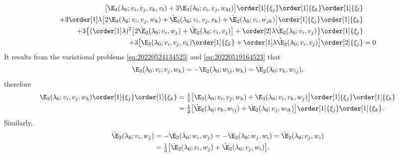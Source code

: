 \begin{equation*}
  \begin{aligned}[b]
    \bigl[\E_4(\lambda_0; v_i, v_j, v_k, v_l) + 3\E_3(\lambda_0; v_i, v_j, w_{kl})\bigr] \order[1]{\xi_j} \order[1]{\xi_k} \order[1]{\xi_l}&\\
    + 3\order[1]\lambda \bigl[2\E_3(\lambda_0; v_i, v_j, w_k) + \dot{\E}_3(\lambda_0; v_i, v_j, v_k) + \dot{\E}_2(\lambda_0; v_i, w_{jk}) \bigr] \order[1]{\xi_j} \order[1]{\xi_k}&\\
    + 3 \bigl\{ ( \order[1]\lambda )^2 \bigl[ 2 \dot{\E}_2(\lambda_0; v_i, w_j) + \ddot{\E}_2(\lambda_0; v_i, v_j) \bigr] + \order[2]\lambda \dot{\E}_2(\lambda_0; v_i, v_j) \bigr\}\order[1]{\xi_j}&\\
    + 3\bigl[\E_3(\lambda_0; v_i, v_j, v_k) \order[1]{\xi_k} + \order[1]\lambda \dot{\E}_2(\lambda_0; v_i, v_j)\bigr] \order[2]{\xi_j} &= 0
  \end{aligned}
\end{equation*}
It results from the variational problems \eqref{eq:20220524134525} and
\eqref{eq:20220519164523} that
\begin{equation*}
  \E_3(\lambda_0; v_i, v_j, w_k) = -\E_2(\lambda_0 ; w_{ij}, w_k) = \dot{\E}_2(\lambda_0; v_k, w_{ij}),
\end{equation*}
therefore
\begin{equation*}
  \begin{aligned}[b]
    \E_3(\lambda_0; v_i, v_j, w_k) \order[1]{\xi_j} \order[1]{\xi_k} &= \tfrac{1}{2} \bigl[ \E_3(\lambda_0; v_i, v_j, w_k) + \E_3(\lambda_0; v_i, v_k, w_j)\bigr] \order[1]{\xi_j} \order[1]{\xi_k}\\
                                    &= \tfrac{1}{2} \bigl[ \dot{\E}_2(\lambda_0; v_k, w_{ij}) + \dot{\E}_2(\lambda_0; v_j, w_{ik}) \bigr] \order[1]{\xi_j} \order[1]{\xi_k}.
  \end{aligned}
\end{equation*}
Similarly,
\begin{equation*}
  \begin{aligned}[b]
    \dot{\E}_2(\lambda_0; v_i, w_j) &= -\E_2(\lambda_0; w_i, w_j) = -\E_2(\lambda_0; w_j, w_i) = \dot{\E}_2(\lambda_0; v_j, w_i)\\
                           &= \tfrac{1}{2} \bigl[ \dot{\E}_2(\lambda_0; v_i, w_j) + \dot{\E}_2(\lambda_0; v_j, w_i) \bigr].
  \end{aligned}
\end{equation*}
